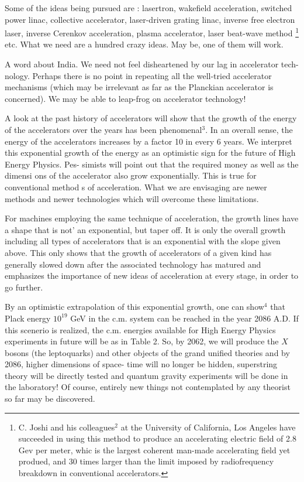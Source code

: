 Some of the ideas being pursued are : lasertron, wakefield acceleration,
switched power
linac, collective accelerator, laser-driven grating linac, inverse free
electron laser, inverse
Cerenkov acceleration, plasma accelerator, laser beat-wave method
\footnote{C. Joshi and his colleagues$^{2}$ at the University of California, Los Angeles have succeeded in using this method to produce an accelerating electric field of 2.8 Gev per meter, whic is the largest coherent man-made accelerating field yet produed, and 30 times larger than the limit imposed by radiofrequency breakdown in conventional accelerators.} etc. What we need
are a hundred crazy ideas. May be, one of them will work.

A word about India. We need not feel disheartened by our lag
in accelerator tech-
nology. Perhaps there is no point in repeating all the well-tried
accelerator mechanisms
(which may be irrelevant as far as the Planckian accelerator
is concerned). We may be
able to leap-frog on accelerator technology!


A look at the past history of accelerators will show that the
growth of the energy of
the accelerators over the years has been phenomenal$^{3}$. In an overall
sense, the energy of
the accelerators increases by a factor 10 in every 6 years. We
interpret this exponential
growth of the energy as an optimistic sign for the future of High
Energy Physics. Pes-
simists will point out that the required money as well as the dimensi
ons of the accelerator
also grow exponentially. This is true for conventional method
s of acceleration. What we are envisaging are newer methods and newer technologies which will overcome these
limitations.

For machines employing the same technique of acceleration, the growth lines have a
shape that is not’ an exponential, but taper off. It is only the overall growth including
all types of accelerators that is an exponential with the slope given above. This only
shows that the growth of accelerators of a given kind has generally slowed down after
the associated technology has matured and emphasizes the importance of new ideas of
acceleration at every stage, in order to go further.


By an optimistic extrapolation of this exponential growth, one can show$^{4}$ that Plack
energy $10^{19}$ GeV in the c.m. system can be reached in the year 2086 A.D. If this scenerio
is realized, the c.m. energies available for High Energy Physics experiments in future
will be as in Table 2.
So, by 2062, we will produce the $X$ bosons
(the leptoquarks)
and other objects of the grand unified theories and by 2086, higher dimensions of space-
time will no longer be hidden, superstring theory will be directly tested and quantum
gravity experiments will be done in the laboratory! Of course, entirely new things not
contemplated by any theorist so far may be discovered.

